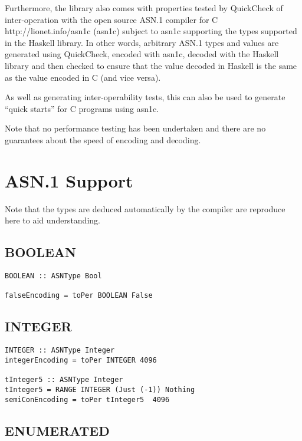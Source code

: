 \documentclass{article}
\begin{document}
Furthermore, the library also comes with properties tested by QuickCheck of inter-operation with
\htmladdnormallinkfoot
{the open source ASN.1 compiler for C}
{http://lionet.info/asn1c}
(asn1c) subject to asn1c supporting the types supported in the Haskell
library. In other words, arbitrary ASN.1 types and values are generated using QuickCheck,
encoded with asn1c, decoded with the Haskell library and then checked
to ensure that the value decoded in Haskell is the same as the value
encoded in C (and vice versa). 

As well as generating inter-operability tests,
this can also be used to generate ``quick starts'' for C programs using asn1c.

Note that no performance testing has been undertaken and there are no
guarantees about the speed of encoding and decoding.

\section{ASN.1 Support}

Note that the types are deduced automatically by the compiler are 
reproduce here to aid understanding.

\subsection{BOOLEAN}

\lstset{language=Haskell}

\begin{lstlisting}[frame=single]
BOOLEAN :: ASNType Bool

falseEncoding = toPer BOOLEAN False
\end{lstlisting}

\subsection{INTEGER}

\begin{lstlisting}[frame=single]
INTEGER :: ASNType Integer
integerEncoding = toPer INTEGER 4096

tInteger5 :: ASNType Integer
tInteger5 = RANGE INTEGER (Just (-1)) Nothing
semiConEncoding = toPer tInteger5  4096
\end{lstlisting}

\subsection{ENUMERATED}
\end{document}
